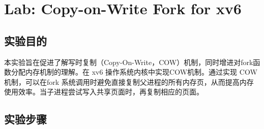 \section{Lab: Copy-on-Write Fork for xv6}
\subsection{实验目的}

本实验旨在促进了解写时复制（Copy-On-Write，COW）机制，同时增进对fork函数分配内存机制的理解。在 xv6 操作系统内核中实现COW机制。通过实现 COW 机制，可以在fork 系统调用时避免直接复制父进程的所有内存页，从而提高内存使用效率。当子进程尝试写入共享页面时，再复制相应的页面。

\subsection{实验步骤}

